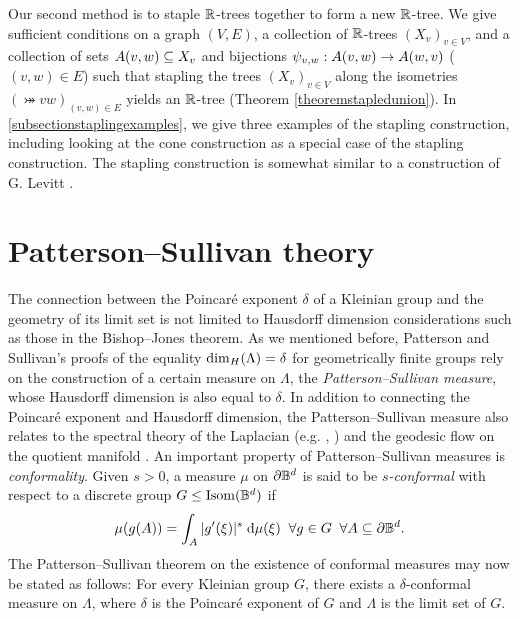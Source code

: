 Our second method is to staple $\R$-trees together to form a new $\R$-tree. We give sufficient conditions on a graph $(V,E)$, a collection of $\R$-trees $(X_v)_{v\in V}$, and a collection of sets $A(v,w)\subseteq X_v$ and bijections $\psi_{v,w}:A(v,w)\to A(w,v)$ ($(v,w)\in E$) such that stapling the trees $(X_v)_{v\in V}$ along the isometries $(\bij vw)_{(v,w)\in E}$ yields an $\R$-tree (Theorem \ref{theoremstapledunion}). In \6\ref{subsectionstaplingexamples}, we give three examples of the stapling construction, including looking at the cone construction as a special case of the stapling construction. The stapling construction is somewhat similar to a construction of G. Levitt \cite{Levitt}.

\bigskip
\section{Patterson--Sullivan theory}
\label{subsectionconformal}

The connection between the Poincar\'e exponent $\delta$ of a Kleinian group and the geometry of its limit set is not limited to Hausdorff dimension considerations such as those in the Bishop--Jones theorem. As we mentioned before, Patterson and Sullivan's proofs of the equality ${\dim_H}(\Lambda) = \delta$ for geometrically finite groups rely on the construction of a certain measure on $\Lambda$, the \emph{Patterson--Sullivan measure}, whose Hausdorff dimension is also equal to $\delta$. In addition to connecting the Poincar\'e exponent and Hausdorff dimension, the Patterson--Sullivan measure also relates to the spectral theory of the Laplacian (e.g. \cite[Theorem 3.1]{Patterson2}, \cite[Proposition 28]{Sullivan_density_at_infinity}) and the geodesic flow on the quotient manifold \cite{Kaimanovich2}. An important property of Patterson--Sullivan measures is \emph{conformality}. Given $s > 0$, a measure $\mu$ on $\del\B^d$ is said to be \emph{$s$-conformal} with respect to a discrete group $G\leq\Isom(\B^d)$ if
\begin{equation}
\label{conformal}
\mu(g(A)) = \int_A |g'(\xi)|^s\;\dee\mu(\xi) \all g\in G \all A\subset \del\B^d.
\end{equation}
The Patterson--Sullivan theorem on the existence of conformal measures may now be stated as follows: For every Kleinian group $G$, there exists a $\delta$-conformal measure on $\Lambda$, where $\delta$ is the Poincar\'e exponent of $G$ and $\Lambda$ is the limit set of $G$.

